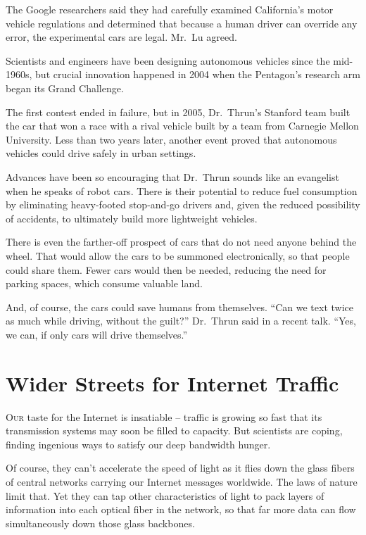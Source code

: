﻿\documentclass[12pt]{article}
\begin{document}
The Google researchers said they had carefully examined California's motor vehicle regulations and
determined that because a human driver can override any error, the experimental cars are legal.
Mr.~Lu agreed.

Scientists and engineers have been designing autonomous vehicles since the mid-1960s, but crucial
innovation happened in 2004 when the Pentagon's research arm began its Grand Challenge.

The first contest ended in failure, but in 2005, Dr.~Thrun's Stanford team built the car that won a
race with a rival vehicle built by a team from Carnegie Mellon University. Less than two years
later, another event proved that autonomous vehicles could drive safely in urban settings.

Advances have been so encouraging that Dr.~Thrun sounds like an evangelist when he speaks of robot
cars. There is their potential to reduce fuel consumption by eliminating heavy-footed stop-and-go
drivers and, given the reduced possibility of accidents, to ultimately build more lightweight
vehicles.

There is even the farther-off prospect of cars that do not need anyone behind the wheel. That would
allow the cars to be summoned electronically, so that people could share them. Fewer cars would then
be needed, reducing the need for parking spaces, which consume valuable land.

And, of course, the cars could save humans from themselves. ``Can we text twice as much while
driving, without the guilt?'' Dr.~Thrun said in a recent talk. ``Yes, we can, if only cars will
drive themselves.''

\section{Wider Streets for Internet Traffic}

\lettrine{O}{ur} taste for the Internet is insatiable -- traffic is growing
so fast that its transmission systems may soon be filled to capacity. But scientists are coping,
finding ingenious ways to satisfy our deep bandwidth hunger.

Of course, they can't accelerate the speed of light as it flies down the glass fibers of central
networks carrying our Internet messages worldwide. The laws of nature limit that. Yet they can tap
other characteristics of light to pack layers of information into each optical fiber in the network,
so that far more data can flow simultaneously down those glass backbones.
\end{document}
